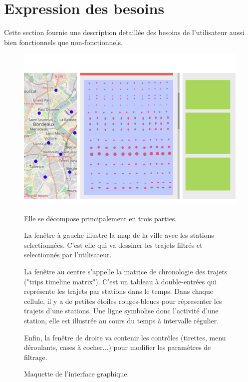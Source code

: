 \documentclass[12pt]{article}
\begin{document}
	\section{Expression des besoins}
		Cette section fournie une description detaillée des besoins de l'utilisateur aussi bien fonctionnels que non-fonctionnels.

		\begin{figure}[!ht]
		\includegraphics[scale=.5]{maquette.png}
		\caption{Maquette de l'interface graphique.}
		\medskip
		Elle se décompose principalement en trois parties.\par

		La fenêtre à gauche illustre la map de la ville avec les stations selectionnées.
		C'est elle qui va dessiner les trajets filtrés et selectionnés par l'utilisateur.\par

		La fenêtre au centre s'appelle la matrice de chronologie des trajets ("trips timeline matrix").
		C'est un tableau à double-entrées qui représente les trajets par stations dans le temps.
		Dans chaque cellule, il y a de petites étoiles rouges-bleues pour répresenter les trajets d'une stations.
		Une ligne symbolise donc l'activité d'une station, elle est illustrée au cours du temps à intervalle régulier.\par

		Enfin, la fenêtre de droite va contenir les contrôles (tirettes, menu déroulants, cases à cocher...) pour modifier les paramètres de filtrage.
		\end{figure}
\end{document}

